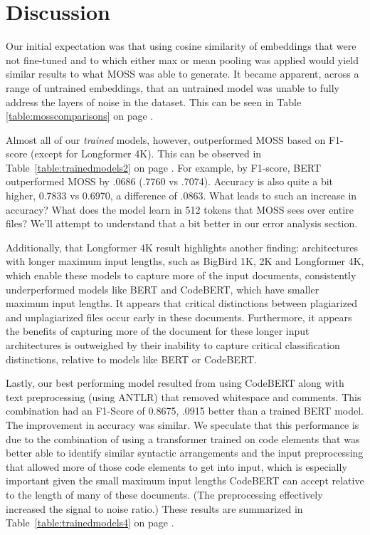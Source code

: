 \documentclass[twocolumn]{article}
\begin{document}
\section{\large Discussion}


Our initial expectation was that using cosine similarity of embeddings that were not fine-tuned and to which either max or mean pooling was applied would yield similar results to what MOSS was able to generate. It became apparent, across a range of untrained embeddings, that an untrained model was unable to fully address the layers of noise in the dataset. This can be seen in Table \ref{table:mosscomparisons}  on page \pageref{table:mosscomparisons}.

Almost all of our \emph{trained} models, however, outperformed MOSS based on F1-score (except for Longformer 4K). This can be observed in Table~\ref{table:trainedmodels2} on page \pageref{table:trainedmodels2}. For example, by F1-score, BERT outperformed MOSS by .0686 (.7760 vs .7074). Accuracy is also quite a bit higher, 0.7833 vs 0.6970, a difference of .0863. What leads to such an increase in accuracy? What does the model learn in 512 tokens that MOSS sees over entire files? We'll attempt to understand that a bit better in our error analysis section. 

Additionally, that Longformer 4K result highlights another finding: architectures with longer maximum input lengths, such as BigBird 1K, 2K and Longformer 4K, which enable these models to capture more of the input documents, consistently underperformed models like BERT and CodeBERT, which have smaller maximum input lengths. It appears that critical distinctions between plagiarized and unplagiarized files occur early in these documents. Furthermore, it appears the benefits of capturing more of the document for these longer input architectures is outweighed by their inability to capture critical classification distinctions, relative to models like BERT or CodeBERT.

Lastly, our best performing model resulted from using CodeBERT along with text preprocessing (using ANTLR) that removed whitespace and comments. This combination had an F1-Score of 0.8675, .0915 better than a trained BERT model. The improvement in accuracy was similar. We speculate that this performance is due to the combination of using a transformer trained on code elements that was better able to identify similar syntactic arrangements and the input preprocessing that allowed more of those code elements to get into input, which is especially important given the small maximum input lengths CodeBERT can accept relative to the length of many of these documents. (The preprocessing effectively increased the signal to noise ratio.) These results are summarized in Table~\ref{table:trainedmodels4} on page \pageref{table:trainedmodels4}.
\end{document}
